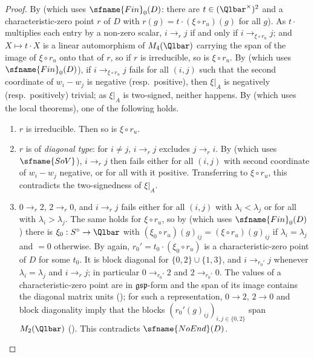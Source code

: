 \begin{proof}
By  (which uses $\sfname{Fin}_0(D)$: there are
$t\in(\Qlbar^\times)^2$ and a characteristic-zero point $r$ of $D$ with $r(g)=t\cdot(\xi\circ r_u)(g)$ for all $g$). As
$t\cdot$ multiplies each entry by a non-zero scalar, $i\to_rj$ if and only if $i\to_{\xi\circ r_u}j$; and $X\mapsto t\cdot X$
is a linear automorphism of $M_4(\Qlbar)$ carrying the span of the image of $\xi\circ r_u$ onto that of $r$, so if $r$ is
irreducible, so is $\xi\circ r_u$. By  (which uses
$\sfname{Fin}_0(D)$), if $i\to_{\xi\circ r_u}j$ fails for all $(i,j)$ such that the second coordinate of $w_i-w_j$ is
negative (resp.\ positive), then $\xi|_A$ is negatively (resp.\ positively) trivial; as $\xi|_A$ is two-signed, neither
happens. By  (which uses the local theorems), one of the
following holds.
\begin{enumerate}[label=(\alph*)]
\item $r$ is irreducible. Then so is $\xi\circ r_u$.
\item $r$ is of \emph{diagonal type}: for $i\ne j$, $i\to_rj$ excludes $j\to_ri$. By
 (which uses $\sfname{SoV}$), $i\to_rj$ then fails either
for all $(i,j)$ with second coordinate of $w_i-w_j$ negative, or for all with it positive. Transferring to $\xi\circ r_u$,
this contradicts the two-signedness of $\xi|_A$.
\item $0\to_r2$, $2\to_r0$, and $i\to_rj$ fails either for all $(i,j)$ with $\lambda_i<\lambda_j$ or for all with
$\lambda_i>\lambda_j$. The same holds for $\xi\circ r_u$, so by
 (which uses $\sfname{Fin}_0(D)$) there is
$\xi_0:S^\circ\to\Qlbar$ with $(\xi_0\circ r_u)(g)_{ij}=(\xi\circ r_u)(g)_{ij}$ if $\lambda_i=\lambda_j$ and $=0$ otherwise.
By  again, $r_0'=t_0\cdot(\xi_0\circ r_u)$ is a
characteristic-zero point of $D$ for some $t_0$. It is block diagonal for $\{0,2\}\cup\{1,3\}$, and $i\to_{r_0'}j$ whenever
$\lambda_i=\lambda_j$ and $i\to_rj$; in particular $0\to_{r_0'}2$ and $2\to_{r_0'}0$. The values of a characteristic-zero
point are in $\mathfrak{gsp}$-form and the span of its image contains the diagonal matrix units
(); for such a representation, $0\to2$, $2\to0$ and block
diagonality imply that the blocks $(r_0'(g)_{ij})_{i,j\in\{0,2\}}$ span $M_2(\Qlbar)$
(). This contradicts $\sfname{NoEnd}(D)$.\qedhere
\end{enumerate}
\end{proof}

